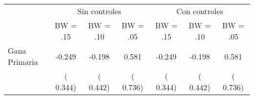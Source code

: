 
\begin{tabular}{lcccccc}
\hline\hline
 & \multicolumn{3}{c}{Sin controles} & \multicolumn{3}{c}{Con controles} \\
\cline{2-7}
 & BW = .15 & BW = .10 & BW = .05 & BW = .15 & BW = .10 & BW = .05 \\
\hline
Gana Primaria &    -0.249 &    -0.198 &     0.581 &    -0.249 &    -0.198 &     0.581 & \\
 & (    0.344) & (    0.442) & (    0.736) & (    0.344) & (    0.442) & (    0.736) & \\
\hline\hline
\end{tabular}